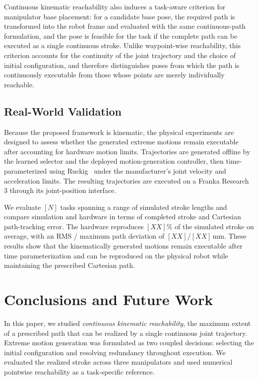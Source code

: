 \documentclass[journal, twoside]{IEEEtran}
\begin{document}
Continuous kinematic reachability also induces a task-aware criterion for
manipulator base placement: for a candidate base pose, the required path
is transformed into the robot frame and evaluated with the same
continuous-path formulation, and the pose is feasible for the task if the
complete path can be executed as a single continuous stroke. Unlike
waypoint-wise reachability, this criterion accounts for the continuity of
the joint trajectory and the choice of initial configuration, and
therefore distinguishes poses from which the path is continuously
executable from those whose points are merely individually reachable.


\subsection{Real-World Validation}
\label{sec:real}

Because the proposed framework is kinematic, the physical experiments are designed to assess whether the generated extreme motions remain executable after accounting for hardware motion limits. Trajectories are generated offline by the learned selector and the deployed motion-generation controller, then time-parameterized using Ruckig~\cite{berscheid2021jerk} under the manufacturer's joint velocity and acceleration limits. The resulting trajectories are executed on a Franka Research 3 through its joint-position interface.

We evaluate $[N]$ tasks spanning a range of simulated stroke lengths and compare simulation and hardware in terms of completed stroke and Cartesian path-tracking error. The hardware reproduces $[XX]\%$ of the simulated stroke on average, with an RMS / maximum path deviation of $[XX]/[XX]$\,mm. These results show that the kinematically generated motions remain executable after time parameterization and can be reproduced on the physical robot while maintaining the prescribed Cartesian path.


\section{Conclusions and Future Work}
\label{sec:conclusion}

In this paper, we studied \textit{continuous kinematic reachability}, the maximum extent of a prescribed path that can be realized by a single continuous joint trajectory. Extreme motion generation was formulated as two coupled decisions: selecting the initial configuration and resolving redundancy throughout execution. We evaluated the realized stroke across three manipulators and used numerical pointwise reachability as a task-specific reference.
\end{document}
